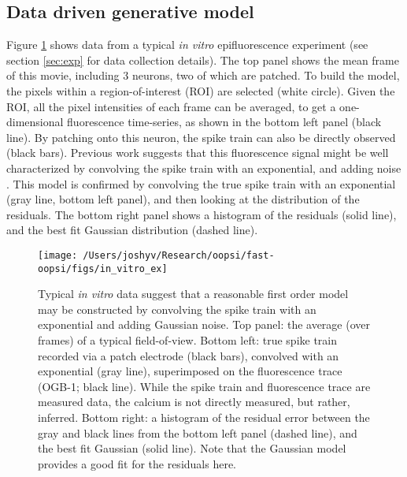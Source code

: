 \subsection{Data driven generative model} \label{sec:model}

Figure \ref{fig:in_vitro_ex} shows data from a typical \emph{in vitro} epifluorescence experiment (see section \ref{sec:exp} for data collection details).  The top panel shows the mean frame of this movie, including 3 neurons, two of which are patched.  To build the model, the pixels within a region-of-interest (ROI) are selected (white circle).  Given the ROI, all the pixel intensities of each frame can be averaged, to get a one-dimensional fluorescence time-series, as shown in the bottom left panel (black line).  By patching onto this neuron, the spike train can also be directly observed (black bars). Previous work suggests that this fluorescence signal might be well characterized by convolving the spike train with an exponential, and adding noise \cite{ImagingManual}.  This model is confirmed by convolving the true spike train with an exponential (gray line, bottom left panel), and then looking at the distribution of the residuals.  The bottom right panel shows a histogram of the residuals (solid line), and the best fit Gaussian distribution (dashed line).


\begin{figure}[h!]
\centering \texttt{[image: /Users/joshyv/Research/oopsi/fast-oopsi/figs/in\_vitro\_ex]}
\caption[data-based model]{Typical \emph{in vitro} data suggest that a reasonable first order model may be constructed by convolving the spike train with an exponential and adding Gaussian noise. Top panel: the average (over frames) of a typical field-of-view.  Bottom left: true spike train recorded via a patch electrode (black bars), convolved with an exponential (gray line), superimposed on the fluorescence trace (OGB-1; black line).  While the spike train and fluorescence trace are measured data, the calcium is not directly measured, but rather, inferred.  Bottom right: a histogram of the residual error between the gray and black lines from the bottom left panel (dashed line), and the best fit Gaussian (solid line). Note that the Gaussian model provides a good fit for the residuals here.} \label{fig:in_vitro_ex}
\end{figure}

